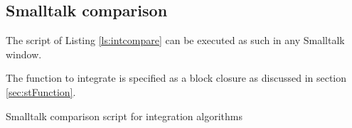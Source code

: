 \documentclass[twoside]{book}
\begin{document}
\subsection{Smalltalk comparison}
\label{sec:sintcompar} The script of Listing \ref{ls:intcompare}
can be executed as such in any Smalltalk window.

The function to integrate is specified as a block closure as
discussed in section \ref{sec:stFunction}.
\begin{listing} Smalltalk comparison script for integration algorithms \label{ls:intcompare}

\end{listing}

\ifx\wholebook\relax\else
\end{document}
